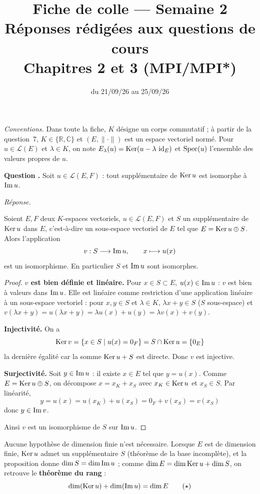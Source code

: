 \documentclass[11pt]{article}
\title{Fiche de colle --- Semaine 2\\ \large Réponses rédigées aux questions de cours\\ Chapitres 2 et 3 (MPI/MPI*)}
\author{}
\date{du 21/09/26 au 25/09/26}
\newcounter{qnum}
\newcommand{\question}[1]{%
\stepcounter{qnum}%
\bigskip
\noindent\textbf{Question \theqnum.} #1\par}
\newcommand{\reponse}{\noindent\textit{Réponse.}\ }
\begin{document}
\maketitle

\noindent\textit{Conventions.} Dans toute la fiche, $K$ désigne un corps commutatif ; à partir de la question~7, $K\in\{\mathbb{R},\mathbb{C}\}$ et $(E,\|\cdot\|)$ est un espace vectoriel normé. Pour $u\in\mathcal{L}(E)$ et $\lambda\in K$, on note $E_\lambda(u)=\operatorname{Ker}(u-\lambda\,\operatorname{id}_E)$ et $\operatorname{Spec}(u)$ l'ensemble des valeurs propres de $u$.

\question{Soit $u\in\mathcal{L}(E,F)$ : tout supplémentaire de $\operatorname{Ker} u$ est isomorphe à $\operatorname{Im} u$.}
\reponse

\begin{prop}
\label{prop:supplementaire-noyau}
Soient $E,F$ deux $K$-espaces vectoriels, $u\in\mathcal{L}(E,F)$ et $S$ un supplémentaire de $\operatorname{Ker} u$ dans $E$, c'est-à-dire un sous-espace vectoriel de $E$ tel que $E=\operatorname{Ker} u\oplus S$. Alors l'application
\[v : S\longrightarrow \operatorname{Im} u, \qquad x\longmapsto u(x)\]
est un isomorphisme. En particulier $S$ et $\operatorname{Im} u$ sont isomorphes.
\end{prop}

\begin{proof}
\textbf{$v$ est bien définie et linéaire.} Pour $x\in S\subset E$, $u(x)\in\operatorname{Im} u$ : $v$ est bien à valeurs dans $\operatorname{Im} u$. Elle est linéaire comme restriction d'une application linéaire à un sous-espace vectoriel : pour $x,y\in S$ et $\lambda\in K$, $\lambda x+y\in S$ ($S$ sous-espace) et $v(\lambda x+y)=u(\lambda x+y)=\lambda u(x)+u(y)=\lambda v(x)+v(y)$.

\textbf{Injectivité.} On a
\[\operatorname{Ker} v = \{x\in S \mid u(x)=0_F\} = S\cap\operatorname{Ker} u = \{0_E\}\]
la dernière égalité car la somme $\operatorname{Ker} u + S$ est directe. Donc $v$ est injective.

\textbf{Surjectivité.} Soit $y\in\operatorname{Im} u$ : il existe $x\in E$ tel que $y=u(x)$. Comme $E=\operatorname{Ker} u\oplus S$, on décompose $x=x_K+x_S$ avec $x_K\in\operatorname{Ker} u$ et $x_S\in S$. Par linéarité,
\[y = u(x) = u(x_K)+u(x_S) = 0_F + v(x_S) = v(x_S)\]
donc $y\in\operatorname{Im} v$.

Ainsi $v$ est un isomorphisme de $S$ sur $\operatorname{Im} u$.
\end{proof}

\begin{remarque}
Aucune hypothèse de dimension finie n'est nécessaire. Lorsque $E$ est de dimension finie, $\operatorname{Ker} u$ admet un supplémentaire $S$ (théorème de la base incomplète), et la proposition donne $\dim S=\dim\operatorname{Im} u$ ; comme $\dim E=\dim\operatorname{Ker} u+\dim S$, on retrouve le \textbf{théorème du rang} :
\[\dim(\operatorname{Ker} u)+\dim(\operatorname{Im} u)=\dim E \tag{$\star$}\label{eq:rang}\]
\end{remarque}
\end{document}
